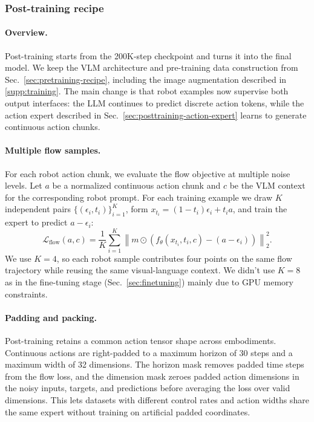 \subsubsection{Post-training recipe}
\label{sec:posttraining-recipe}

\paragraph{Overview.}
Post-training starts from the 200K-step \molmoacttpre checkpoint and turns it into the final \molmoactt model. We keep the VLM architecture and pre-training data construction from Sec.~\ref{sec:pretraining-recipe}, including the image augmentation described in \autoref{supp:training}. The main change is that robot examples now supervise both output interfaces: the LLM continues to predict discrete action tokens, while the action expert described in Sec.~\ref{sec:posttraining-action-expert} learns to generate continuous action chunks.

\paragraph{Multiple flow samples.}
For each robot action chunk, we evaluate the flow objective at multiple noise levels. Let \(a\) be a normalized continuous action chunk and \(c\) be the VLM context for the corresponding robot prompt. For each training example we draw \(K\) independent pairs \(\{(\epsilon_i,t_i)\}_{i=1}^K\), form \(x_{t_i}=(1-t_i)\epsilon_i+t_i a\), and train the expert to predict \(a-\epsilon_i\):
\begin{equation}
    \mathcal{L}_{\mathrm{flow}}(a,c)
    =
    \frac{1}{K}
    \sum_{i=1}^{K}
    \left\|
    m \odot
    \left(
    f_\theta(x_{t_i},t_i,c) - (a-\epsilon_i)
    \right)
    \right\|_2^2 .
\end{equation}
We use \(K=4\), so each robot sample contributes four points on the same flow trajectory while reusing the same visual-language context. We didn't use \(K=8\) as in the fine-tuning stage (Sec.~\ref{sec:finetuning}) mainly due to GPU memory constraints.

\paragraph{Padding and packing.}
Post-training retains a common action tensor shape across embodiments. Continuous actions are right-padded to a maximum horizon of 30 steps and a maximum width of 32 dimensions. The horizon mask removes padded time steps from the flow loss, and the dimension mask zeroes padded action dimensions in the noisy inputs, targets, and predictions before averaging the loss over valid dimensions. This lets datasets with different control rates and action widths share the same expert without training on artificial padded coordinates.

